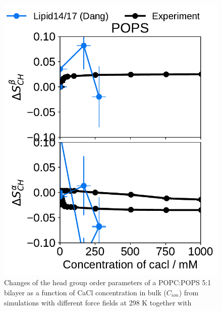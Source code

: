 \documentclass[journal=jpcbfk,manuscript=article]{achemso}
\newlength{\figwidth}
\begin{document}
\begin{figure}[htb!]
  \includegraphics[width=\figwidth]{../Fig/l17/order_parameters_changes_A-B_POPS_cacl.pdf} 
  \caption{\label{fig:delta_ordPar_CaCl_l17} 
    Changes of the head group order parameters of a POPC:POPS 5:1 bilayer as a function of CaCl concentration 
    in bulk ($C_{ion}$) from simulations with different force fields at 298 K together with  
  } 
\end{figure} 
 
\end{document}
